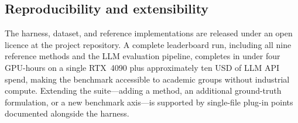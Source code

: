 \subsection{Reproducibility and extensibility}

The harness, dataset, and reference implementations are released
under an open licence at the project repository.  A complete
leaderboard run, including all nine reference methods and the LLM
evaluation pipeline, completes in under four GPU-hours on a single
RTX~4090 plus approximately ten USD of LLM API spend, making the
benchmark accessible to academic groups without industrial compute.
Extending the suite---adding a method, an additional ground-truth
formulation, or a new benchmark axis---is supported by single-file
plug-in points documented alongside the harness.

